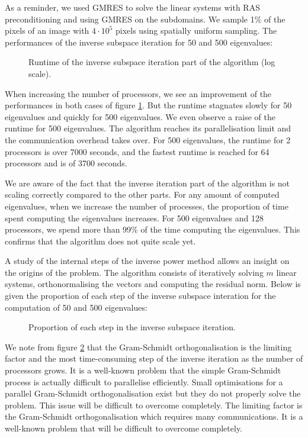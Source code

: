 As a reminder, we used GMRES to solve the linear systems with RAS preconditioning and using GMRES on the subdomains.
We sample 1\% of the pixels of an image with \(4 \cdot 10^5\) pixels using spatially uniform sampling.
The performances of the inverse subspace iteration for 50 and 500 eigenvalues:

\begin{figure}[H]
 \centering
 
 \caption{Runtime of the inverse subspace iteration part of the algorithm (log scale).}
 \label{fig:inv_it_runtime}
\end{figure}

When increasing the number of processors, we see an improvement of the performances in both cases of figure \ref{fig:inv_it_runtime}.
But the runtime stagnates slowly for 50 eigenvalues and quickly for 500 eigenvalues.
We even observe a raise of the runtime for 500 eigenvalues.
The algorithm reaches its parallelisation limit and the communication overhead takes over.
For 500 eigenvalues, the runtime for 2 processors is over 7000 seconds, and the fastest runtime is reached for 64 processors and is of 3700 seconds.

\ifthesis
 We are aware of the fact that the inverse iteration part of the algorithm is not scaling correctly compared to the other parts.
 For any amount of computed eigenvalues, when we increase the number of processes, the proportion of time spent computing the eigenvalues increases.
 For 500 eigenvalues and 128 processors, we spend more than 99\% of the time computing the eigenvalues.
 This confirms that the algorithm does not quite scale yet.
\fi

A study of the internal steps of the inverse power method allows an insight on the origins of the problem.
The algorithm consists of iteratively solving \(m\) linear systems, orthonormalising the vectors and computing the residual norm.
\ifthesis
 Below is given the proportion of each step of the inverse subspace interation for the computation of 50 and 500 eigenvalues:

 \begin{figure}[H]
  \centering
  
  \caption{Proportion of each step in the inverse subspace iteration.}
  \label{fig:inv_it_proportion}
 \end{figure}

 We note from figure \ref{fig:inv_it_proportion} that the Gram-Schmidt orthogonalisation is the limiting factor and the most time-consuming step of the inverse iteration as the number of processors grows.
 It is a well-known problem that the simple Gram-Schmidt process is actually difficult to parallelise efficiently.
 Small optimisations for a parallel Gram-Schmidt orthogonalisation exist \cite{katagiri_parallel_gram_schmidt_2003} but they do not properly solve the problem.
 This issue will be difficult to overcome completely.
\else
 The limiting factor is the Gram-Schmidt orthogonalisation which requires many communications.
 It is a well-known problem that will be difficult to overcome completely.
\fi
